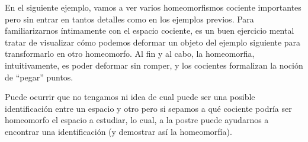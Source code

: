 En el siguiente ejemplo, vamos a ver varios homeomorfismos cociente importantes pero sin entrar en tantos detalles como en los ejemplos previos. Para familiarizarnos íntimamente con el espacio cociente, es un buen ejercicio mental tratar de visualizar cómo podemos deformar un objeto del ejemplo siguiente para transformarlo en otro homeomorfo. Al fin y al cabo, la homeomorfia, intuitivamente, es poder deformar sin romper, y los cocientes formalizan la noción de ``pegar'' puntos.
\begin{obs}
	Puede ocurrir que no tengamos ni idea de cual puede ser una posible identificación entre un espacio y otro pero si sepamos a qué cociente podría ser homeomorfo el espacio a estudiar, lo cual, a la postre puede ayudarnos a encontrar una identificación (y demostrar así la homeomorfía).
\end{obs}
